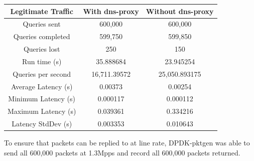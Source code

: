 \documentclass[12pt]{extarticle}
\begin{document}
\begin{center}
\begin{tabular}{ ||c|c|c|| }
\hline
Legitimate Traffic & With dns-proxy & Without dns-proxy \\
\hline
Queries sent & 600,000 & 600,000 \\
Queries completed & 599,750 & 599,850 \\
Queries lost & 250 & 150 \\
Run time (s) & 35.888684 & 23.945254 \\
Queries per second & 16,711.39572 & 25,050.893175 \\
Average Latency (s) & 0.00373 & 0.00254 \\
Minimum Latency (s) & 0.000117 & 0.000112 \\
Maximum Latency (s) & 0.039361 & 0.334216 \\
Latency StdDev (s) & 0.003353 & 0.010643 \\
\hline
\end{tabular}
\end{center}

To ensure that packets can be replied to at line rate, DPDK-pktgen was able to send all 600,000 packets at 1.3Mpps and record all 600,000 packets returned. \\
\end{document}
